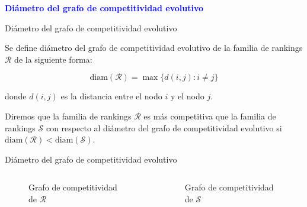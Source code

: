 \documentclass[10pt]{beamer}
\begin{document}
	\begin{frame}
		\begin{center}
			\Huge\textbf{\textsf{\textcolor{blue}{Diámetro del grafo de competitividad evolutivo}}}
		\end{center}
	\end{frame}
	
	\begin{frame}{Diámetro del grafo de competitividad evolutivo}
		\begin{defi}
			Se define diámetro del grafo de competitividad evolutivo de la familia de rankings $\mathcal{R}$ de la siguiente forma:
			
			\begin{equation}
			\mathrm{diam}(\mathcal{R}) = \max \{ d(i,j) : i \neq j \}
			\end{equation}
			
			donde $d(i,j)$ es la distancia entre el nodo $i$ y el nodo $j$.
		\end{defi}
		
		\begin{defi}
			Diremos que la familia de rankings $\mathcal{R}$ es más competitiva que la familia de rankings $\mathcal{S}$ con respecto al diámetro del grafo de competitividad evolutivo si $\mathrm{diam}(\mathcal{R}) < \mathrm{diam}(\mathcal{S})$.
		\end{defi}
	\end{frame}
	
	\begin{frame}{Diámetro del grafo de competitividad evolutivo}
		\begin{ejemplo}
			\begin{columns}[t] %
				\begin{column}{.50\textwidth}
					\begin{figure}
						\centering
						\resizebox{!}{0.4\textheight}{\ejemplografocompetitividadevolutivo}
						\caption{Grafo de competitividad de $\mathcal{R}$}
					\end{figure}
				\end{column}%
				\hfill%
				\begin{column}{.50\textwidth}
					\begin{figure}
						\centering
						\resizebox{!}{0.4\textheight}{\ejemplofuerzamedia}
						\caption{Grafo de competitividad de $\mathcal{S}$}
					\end{figure}
				\end{column}%
			\end{columns}
		\end{ejemplo}
	\end{frame}
	
\end{document}
